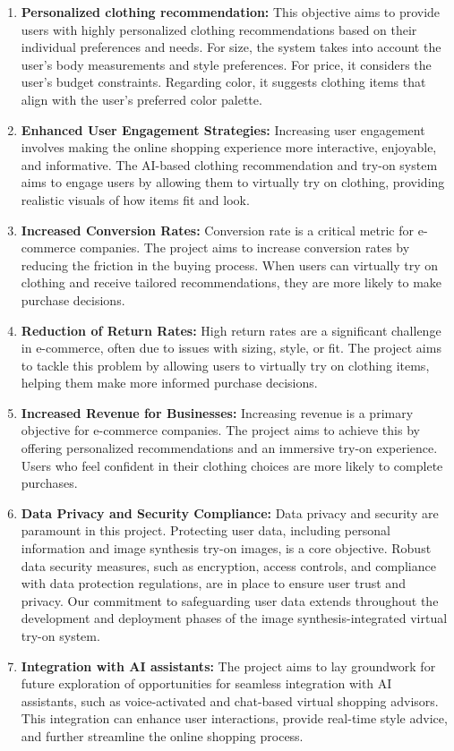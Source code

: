	\begin{enumerate}
		\item \textbf{Personalized clothing recommendation:} This objective aims to provide users with highly personalized clothing recommendations based on their individual preferences and needs. For size, the system takes into account the user's body measurements and style preferences. For price, it considers the user's budget constraints. Regarding color, it suggests clothing items that align with the user's preferred color palette.
		\item \textbf{Enhanced User Engagement Strategies:} Increasing user engagement involves making the online shopping experience more interactive, enjoyable, and informative. The AI-based clothing recommendation and try-on system aims to engage users by allowing them to virtually try on clothing, providing realistic visuals of how items fit and look.
		\item \textbf{Increased Conversion Rates:} Conversion rate is a critical metric for e-commerce companies. The project aims to increase conversion rates by reducing the friction in the buying process. When users can virtually try on clothing and receive tailored recommendations, they are more likely to make purchase decisions.
		\item \textbf{Reduction of Return Rates:} High return rates are a significant challenge in e-commerce, often due to issues with sizing, style, or fit. The project aims to tackle this problem by allowing users to virtually try on clothing items, helping them make more informed purchase decisions.
		\item \textbf{Increased Revenue for Businesses:} Increasing revenue is a primary objective for e-commerce companies. The project aims to achieve this by offering personalized recommendations and an immersive try-on experience. Users who feel confident in their clothing choices are more likely to complete purchases.
		\item \textbf{Data Privacy and Security Compliance:} Data privacy and security are paramount in this project. Protecting user data, including personal information and image synthesis try-on images, is a core objective. Robust data security measures, such as encryption, access controls, and compliance with data protection regulations, are in place to ensure user trust and privacy. Our commitment to safeguarding user data extends throughout the development and deployment phases of the image synthesis-integrated virtual try-on system.
		\item \textbf{Integration with AI assistants:} The project aims to lay groundwork for future exploration of opportunities for seamless integration with AI assistants, such as voice-activated and chat-based virtual shopping advisors. This integration can enhance user interactions, provide real-time style advice, and further streamline the online shopping process.
	\end{enumerate}

